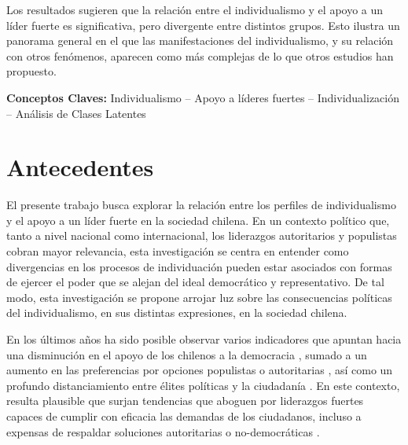 \documentclass[12pt,oneside]{templates/facsothesis}
\begin{document}
Los resultados sugieren que la relación entre el individualismo y el apoyo a un líder fuerte es significativa, pero divergente entre distintos grupos. Esto ilustra un panorama general en el que las manifestaciones del individualismo, y su relación con otros fenómenos, aparecen como más complejas de lo que otros estudios han propuesto.

\textbf{Conceptos Claves:} Individualismo -- Apoyo a líderes fuertes -- Individualización -- Análisis de Clases Latentes

\hypertarget{antecedentes}{%
\chapter*{Antecedentes}\label{antecedentes}}

El presente trabajo busca explorar la relación entre los perfiles de individualismo y el apoyo a un líder fuerte en la sociedad chilena. En un contexto político que, tanto a nivel nacional como internacional, los liderazgos autoritarios y populistas cobran mayor relevancia, esta investigación se centra en entender como divergencias en los procesos de individuación pueden estar asociados con formas de ejercer el poder que se alejan del ideal democrático y representativo. De tal modo, esta investigación se propone arrojar luz sobre las consecuencias políticas del individualismo, en sus distintas expresiones, en la sociedad chilena.

En los últimos años ha sido posible observar varios indicadores que apuntan hacia una disminución en el apoyo de los chilenos a la democracia \citep{cep}, sumado a un aumento en las preferencias por opciones populistas o autoritarias \citep{cadem2023, cerc-mori, diaz2023}, así como un profundo distanciamiento entre élites políticas y la ciudadanía \citep{luna2016}. En este contexto, resulta plausible que surjan tendencias que aboguen por liderazgos fuertes capaces de cumplir con eficacia las demandas de los ciudadanos, incluso a expensas de respaldar soluciones autoritarias o no-democráticas \citep{carlin2018}.
\end{document}
